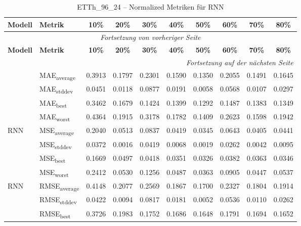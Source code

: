 {\small
\begin{longtable}{l l c c c c c c c c}
    \toprule
    \textbf{Modell} & \textbf{Metrik} & \textbf{10\%} & \textbf{20\%} & \textbf{30\%} & \textbf{40\%} & \textbf{50\%} & \textbf{60\%} & \textbf{70\%} & \textbf{80\%} \\
    \midrule
    \endfirsthead
    \multicolumn{10}{c}{\textit{Fortsetzung von vorheriger Seite}} \\
    \toprule
    \textbf{Modell} & \textbf{Metrik} & \textbf{10\%} & \textbf{20\%} & \textbf{30\%} & \textbf{40\%} & \textbf{50\%} & \textbf{60\%} & \textbf{70\%} & \textbf{80\%} \\
    \midrule
    \endhead
    \midrule
    \multicolumn{10}{r}{\textit{Fortsetzung auf der nächsten Seite}} \\
    \midrule
    \endfoot
    \bottomrule
    \caption{ETTh_96_24 -- Normalized Metriken für RNN}
    \label{tab:etth_96_24_normalized_rnn}
    \endlastfoot
\multirow{4}{*}{RNN} & MAE\textsubscript{average} & 0.3913 & 0.1797 & 0.2301 & 0.1590 & 0.1350 & 0.2055 & 0.1491 & 0.1645 \\
 & MAE\textsubscript{stddev} & 0.0451 & 0.0118 & 0.0877 & 0.0191 & 0.0058 & 0.0568 & 0.0107 & 0.0297 \\
 & MAE\textsubscript{best} & 0.3462 & 0.1679 & 0.1424 & 0.1399 & 0.1292 & 0.1487 & 0.1383 & 0.1349 \\
 & MAE\textsubscript{worst} & 0.4364 & 0.1915 & 0.3178 & 0.1782 & 0.1409 & 0.2623 & 0.1598 & 0.1942 \\
\cmidrule(lr){2-10}
\multirow{4}{*}{RNN} & MSE\textsubscript{average} & 0.2040 & 0.0513 & 0.0837 & 0.0419 & 0.0345 & 0.0643 & 0.0405 & 0.0441 \\
 & MSE\textsubscript{stddev} & 0.0372 & 0.0016 & 0.0419 & 0.0068 & 0.0019 & 0.0262 & 0.0042 & 0.0095 \\
 & MSE\textsubscript{best} & 0.1669 & 0.0497 & 0.0418 & 0.0351 & 0.0326 & 0.0382 & 0.0363 & 0.0346 \\
 & MSE\textsubscript{worst} & 0.2412 & 0.0530 & 0.1256 & 0.0487 & 0.0363 & 0.0905 & 0.0447 & 0.0537 \\
\cmidrule(lr){2-10}
\multirow{4}{*}{RNN} & RMSE\textsubscript{average} & 0.4148 & 0.2077 & 0.2569 & 0.1867 & 0.1700 & 0.2327 & 0.1804 & 0.1914 \\
 & RMSE\textsubscript{stddev} & 0.0422 & 0.0094 & 0.0817 & 0.0181 & 0.0052 & 0.0536 & 0.0110 & 0.0262 \\
 & RMSE\textsubscript{best} & 0.3726 & 0.1983 & 0.1752 & 0.1686 & 0.1648 & 0.1791 & 0.1694 & 0.1652 \\

\end{longtable}}
